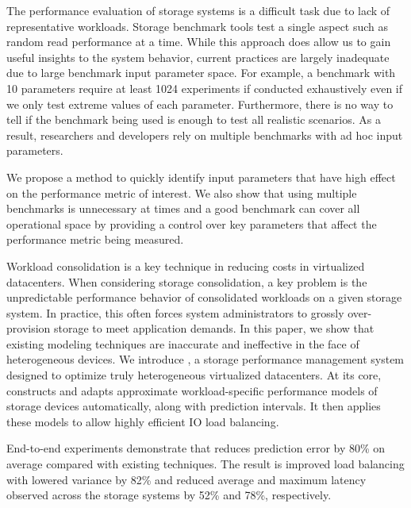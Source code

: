 The performance evaluation of storage systems is a difficult task due to lack of representative workloads. Storage benchmark tools test a single aspect such as random read performance at a time. While this approach does allow us to gain useful insights to the system behavior, current practices are largely inadequate due to large benchmark input parameter space. For example, a benchmark with 10 parameters require at least 1024 experiments if conducted exhaustively even if we only test extreme values of each parameter. Furthermore, there is no way to tell if the benchmark being used is enough to test all realistic scenarios. As a result, researchers and developers rely on multiple benchmarks with ad hoc input parameters.

We propose a method to quickly identify input parameters that have high effect on the performance metric of interest. We also show that using multiple benchmarks is unnecessary at times and a good benchmark can cover all operational space by providing a control over key parameters that affect the performance metric being measured. 

Workload consolidation is a key technique in reducing costs in virtualized datacenters.
When considering storage consolidation, a key problem is the unpredictable performance behavior of consolidated workloads on a given storage system.
In practice, this often forces system administrators to grossly over-provision storage to meet application demands.
In this paper, we show that existing modeling techniques are inaccurate and ineffective in the face of heterogeneous devices.
We introduce {\em\romano}, a storage performance management system designed to optimize truly heterogeneous virtualized datacenters.
At its core, \romano constructs and adapts approximate workload-specific performance models of storage devices automatically, along with prediction intervals.
It then applies these models to allow highly efficient IO load balancing.

End-to-end experiments demonstrate that \romano reduces prediction error by 80\% on average compared with existing techniques.
The result is improved load balancing with lowered variance by 82\% and reduced average and maximum latency observed across the storage systems by 52\% and 78\%, respectively.

